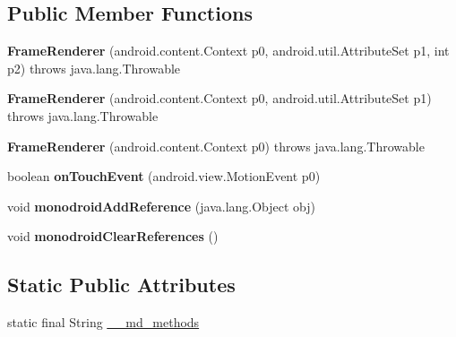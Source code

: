 \subsection*{Public Member Functions}
\begin{DoxyCompactItemize}
\item 
\mbox{\label{classmd5b60ffeb829f638581ab2bb9b1a7f4f3f_1_1FrameRenderer_a985beedccde288d3e108b2fbc0ac7eb9}} 
{\bfseries Frame\+Renderer} (android.\+content.\+Context p0, android.\+util.\+Attribute\+Set p1, int p2)  throws java.\+lang.\+Throwable 	
\item 
\mbox{\label{classmd5b60ffeb829f638581ab2bb9b1a7f4f3f_1_1FrameRenderer_ab87d8b45ebd480c87ae285c0c10dccc9}} 
{\bfseries Frame\+Renderer} (android.\+content.\+Context p0, android.\+util.\+Attribute\+Set p1)  throws java.\+lang.\+Throwable 	
\item 
\mbox{\label{classmd5b60ffeb829f638581ab2bb9b1a7f4f3f_1_1FrameRenderer_a4f57e2437910b58d5918efe5a2232974}} 
{\bfseries Frame\+Renderer} (android.\+content.\+Context p0)  throws java.\+lang.\+Throwable 	
\item 
\mbox{\label{classmd5b60ffeb829f638581ab2bb9b1a7f4f3f_1_1FrameRenderer_a86dff6d2f4926a6282df9c47cb59bbcf}} 
boolean {\bfseries on\+Touch\+Event} (android.\+view.\+Motion\+Event p0)
\item 
\mbox{\label{classmd5b60ffeb829f638581ab2bb9b1a7f4f3f_1_1FrameRenderer_a2178330cfbb272c1b56a10b5cc406576}} 
void {\bfseries monodroid\+Add\+Reference} (java.\+lang.\+Object obj)
\item 
\mbox{\label{classmd5b60ffeb829f638581ab2bb9b1a7f4f3f_1_1FrameRenderer_a9122665ff96453c943de70afacc24f32}} 
void {\bfseries monodroid\+Clear\+References} ()
\end{DoxyCompactItemize}
\subsection*{Static Public Attributes}
\begin{DoxyCompactItemize}
\item 
static final String \hyperlink{classmd5b60ffeb829f638581ab2bb9b1a7f4f3f_1_1FrameRenderer_ad51663e7802471a9ec8a28e818f4c43f}{\+\_\+\+\_\+md\+\_\+methods}
\end{DoxyCompactItemize}
